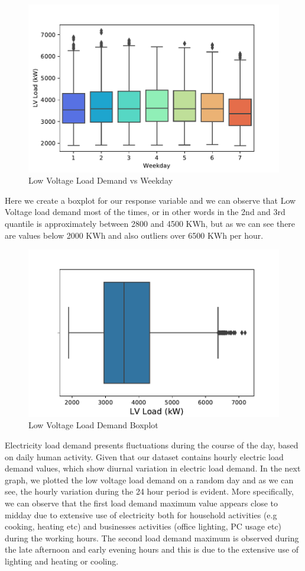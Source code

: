 \begin{figure}[ht!]
\centering
\includegraphics[width=0.75\linewidth]{project/eda2.pdf}

\caption{Low Voltage Load Demand vs Weekday}
\end{figure}
Here we create a boxplot for our response variable and we can observe that Low Voltage load demand most of the times, or in other words in the 2nd and 3rd quantile is approximately between 2800 and 4500 KWh, but as we can see there are values below 2000 KWh and also outliers over 6500 KWh per hour.
\begin{figure}[ht!]
\centering
\includegraphics[width=0.7\linewidth]{project/eda3.pdf}

\caption{Low Voltage Load Demand Boxplot}
\end{figure}
Electricity load demand presents fluctuations during the course of the day, based on daily human activity. Given that our dataset contains hourly electric load demand values, which show diurnal variation in electric load demand. In the next graph, we plotted the low voltage load demand on a random day and as we can see, the hourly variation during the 24 hour period is evident. More specifically, we can observe that the first load demand maximum value appears close to midday due to extensive use of electricity both for household activities (e.g cooking, heating etc) and businesses activities (office lighting, PC usage etc) during the working hours. The second load demand maximum is observed during the late afternoon and early evening hours and this is due to the extensive use of lighting and heating or cooling.
